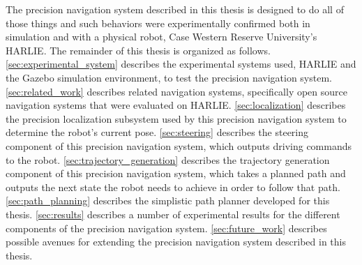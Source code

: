 The precision navigation system described in this thesis is designed to do all of those things and such behaviors were experimentally confirmed both in simulation and with a physical robot, Case Western Reserve University's HARLIE. The remainder of this thesis is organized as follows. \autoref{sec:experimental_system} describes the experimental systems used, HARLIE and the Gazebo simulation environment, to test the precision navigation system. \autoref{sec:related_work} describes related navigation systems, specifically open source navigation systems that were evaluated on HARLIE. \autoref{sec:localization} describes the precision localization subsystem used by this precision navigation system to determine the robot's current pose. \autoref{sec:steering} describes the steering component of this precision navigation system, which outputs driving commands to the robot. \autoref{sec:trajectory_generation} describes the trajectory generation component of this precision navigation system, which takes a planned path and outputs the next state the robot needs to achieve in order to follow that path. \autoref{sec:path_planning} describes the simplistic path planner developed for this thesis. \autoref{sec:results} describes a number of experimental results for the different components of the precision navigation system. \autoref{sec:future_work} describes possible avenues for extending the precision navigation system described in this thesis.
